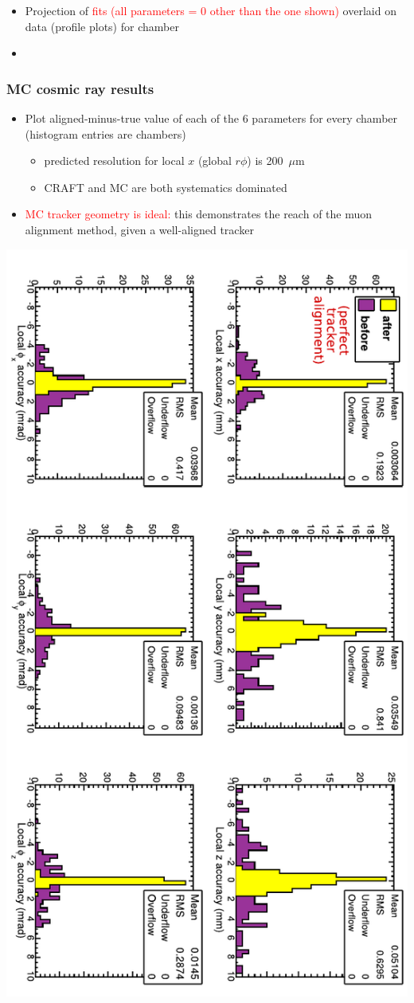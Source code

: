 \documentclass[compress]{beamer}
\begin{document}
\begin{frame}
\begin{columns}
\end{columns}

\begin{itemize}
\item Projection of \textcolor{red}{fits (all parameters = 0 other than the one shown)} overlaid on {\it {}} data (profile plots) for  chamber
\item {}
\end{itemize}
\end{frame}

\begin{frame}
\frametitle{MC cosmic ray results}

\begin{itemize}
\item Plot aligned-minus-true value of each of the 6 parameters for every chamber (histogram entries are chambers)
\begin{itemize}
\item predicted resolution for local $x$ (global $r\phi$) is 200~$\mu$m
\item CRAFT and MC are both systematics dominated
\end{itemize}
\item \textcolor{red}{MC tracker geometry is ideal:} this demonstrates
  the reach of the muon alignment method, given a well-aligned tracker
\end{itemize}

\begin{center}
\includegraphics[height=0.9\linewidth, angle=90]{hip_MC_simple2.pdf}
\end{center}
\end{frame}
\end{document}
